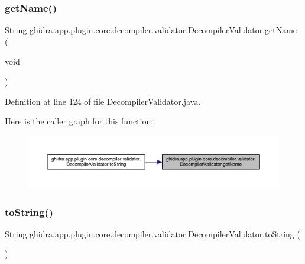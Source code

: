 \subsubsection{\texorpdfstring{getName()}{getName()}}
{\footnotesize\ttfamily String ghidra.\+app.\+plugin.\+core.\+decompiler.\+validator.\+Decompiler\+Validator.\+get\+Name (\begin{DoxyParamCaption}\item[{void}]{ }\end{DoxyParamCaption})\hspace{0.3cm}{\ttfamily [inline]}}



Definition at line 124 of file Decompiler\+Validator.\+java.

Here is the caller graph for this function\+:
\nopagebreak
\begin{figure}[H]
\begin{center}
\leavevmode
\includegraphics[width=350pt]{classghidra_1_1app_1_1plugin_1_1core_1_1decompiler_1_1validator_1_1_decompiler_validator_a0f9aea6b7004ec347e3b92d3be172f1a_icgraph}
\end{center}
\end{figure}
\mbox{\label{classghidra_1_1app_1_1plugin_1_1core_1_1decompiler_1_1validator_1_1_decompiler_validator_a6f5f4f64b44aeb756ed050b65834c02e}} 
\subsubsection{\texorpdfstring{toString()}{toString()}}
{\footnotesize\ttfamily String ghidra.\+app.\+plugin.\+core.\+decompiler.\+validator.\+Decompiler\+Validator.\+to\+String (\begin{DoxyParamCaption}{ }\end{DoxyParamCaption})\hspace{0.3cm}{\ttfamily [inline]}}



